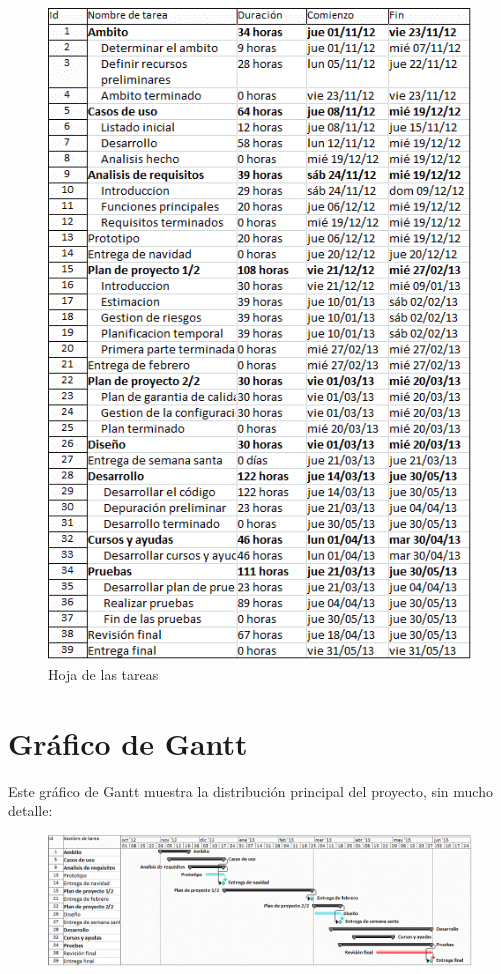\documentclass[spanish,a4paper,12pt]{report}	%
\begin{document}
	\begin{figure}[!h]
	\centering
	\includegraphics[scale=0.95]{HojaTareas.png}
	\caption{Hoja de las tareas}
	\end{figure}

	\newpage

	\section{Gráfico de  Gantt}

	Este gráfico de Gantt  muestra la distribución principal del proyecto, sin mucho detalle:

	\begin{figure}[!h]
	\centering
	\includegraphics[scale=0.57]{GraficoGantt.png}
	\end{figure}
\end{document}
